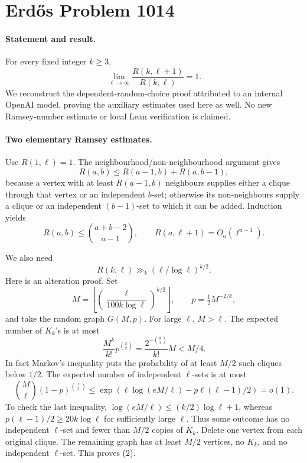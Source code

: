 \section*{Erd\H{o}s Problem 1014}

\paragraph{Statement and result.}
For every fixed integer \(k\geq3\),
\[
 \lim_{\ell\to\infty}\frac{R(k,\ell+1)}{R(k,\ell)}=1.
\]
We reconstruct the dependent-random-choice proof attributed to an internal OpenAI model, proving the auxiliary estimates used here as well. No new Ramsey-number estimate or local Lean verification is claimed.

\paragraph{Two elementary Ramsey estimates.}
Use \(R(1,\ell)=1\). The neighbourhood/non-neighbourhood argument gives
\[
 R(a,b)\leq R(a-1,b)+R(a,b-1),
\]
because a vertex with at least \(R(a-1,b)\) neighbours supplies either a clique through that vertex or an independent \(b\)-set; otherwise its non-neighbours supply a clique or an independent \((b-1)\)-set to which it can be added. Induction yields
\[
 R(a,b)\leq\binom{a+b-2}{a-1},\qquad
 R(a,\ell+1)=O_a(\ell^{a-1}).
\tag{1}
\]

We also need
\[
 R(k,\ell)\gg_k(\ell/\log\ell)^{k/2}.
\tag{2}
\]
Here is an alteration proof. Set
\[
 M=\left\lfloor\left(\frac{\ell}{100k\log\ell}\right)^{k/2}\right\rfloor,
 \qquad p=\tfrac12 M^{-2/k},
\]
and take the random graph \(G(M,p)\). For large \(\ell\), \(M>\ell\). The expected number of \(K_k\)'s is at most
\[
 \frac{M^k}{k!}p^{\binom k2}
 =\frac{2^{-\binom k2}}{k!}M<M/4.
\]
In fact Markov's inequality puts the probability of at least \(M/2\) such cliques below \(1/2\). The expected number of independent \(\ell\)-sets is at most
\[
 \binom M\ell(1-p)^{\binom\ell2}
 \leq\exp\!\left(\ell\log(eM/\ell)-p\ell(\ell-1)/2\right)=o(1).
\]
To check the last inequality, \(\log(eM/\ell)\leq(k/2)\log\ell+1\), whereas \(p(\ell-1)/2\geq20k\log\ell\) for sufficiently large \(\ell\). Thus some outcome has no independent \(\ell\)-set and fewer than \(M/2\) copies of \(K_k\). Delete one vertex from each original clique. The remaining graph has at least \(M/2\) vertices, no \(K_k\), and no independent \(\ell\)-set. This proves (2).

